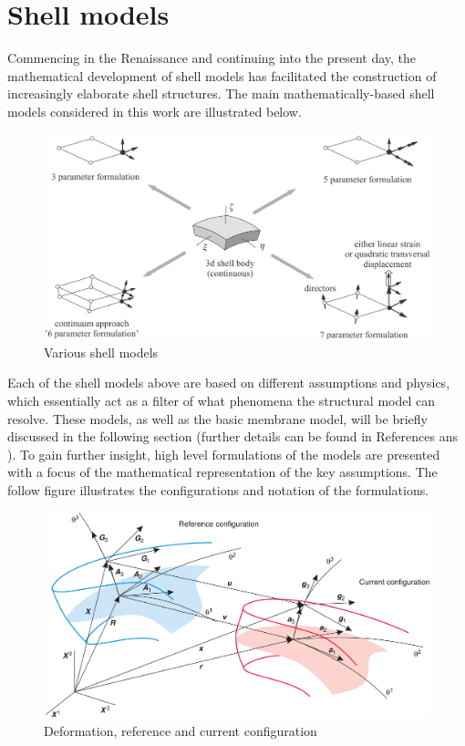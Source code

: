 \section{Shell models}

Commencing in the Renaissance and continuing into the present day, the mathematical development of shell models has facilitated the construction of increasingly elaborate shell structures. The main mathematically-based shell models considered in this work are illustrated below.

\begin{figure}[H]
	\centering
	\def\svgwidth{\columnwidth}
	\includegraphics[width=12cm]{images/shellModels.png}
	\caption{Various shell models \cite{Wall2000}}
	\label{shellModels}
\end{figure}

Each of the shell models above are based on different assumptions and physics, which essentially act as a filter of what phenomena the structural model can resolve. These models, as well as the basic membrane model, will be briefly discussed in the following section (further details can be found in References \cite{BischLitBook04} \cite{RammLitBook04} ans \cite{Echter13}). To gain further insight, high level formulations of the models are presented with a focus of the mathematical representation of the key assumptions.  The follow figure illustrates the configurations and notation of the formulations. 

\begin{figure}[H]
	\centering
	\def\svgwidth{\columnwidth}
	\includegraphics[width=12cm]{images/shellsconfig.png}
	\caption{Deformation, reference and current configuration \cite{BischLitBook04}}
	\label{shellsconfig}
\end{figure}

